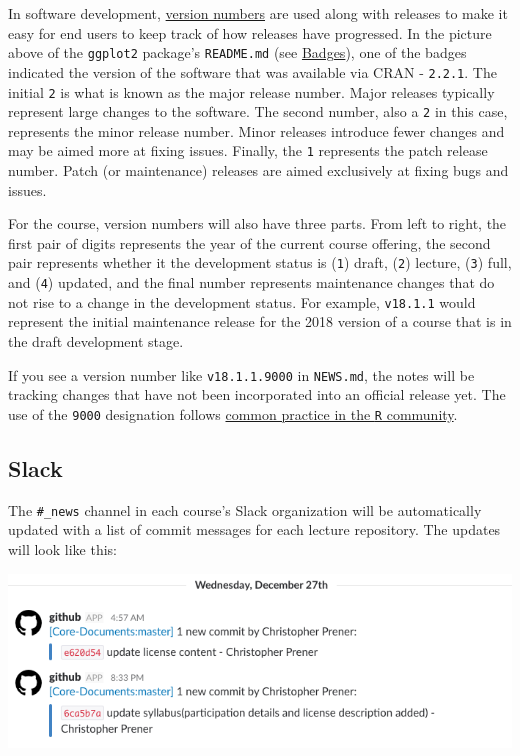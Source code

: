 \documentclass[]{book}
\theoremstyle{definition}
\theoremstyle{definition}
\theoremstyle{definition}
\theoremstyle{remark}
\begin{document}
In software development,
\href{https://en.wikipedia.org/wiki/Software_versioning}{version
numbers} are used along with releases to make it easy for end users to
keep track of how releases have progressed. In the picture above of the
\texttt{ggplot2} package's \texttt{README.md} (see
\protect\hyperlink{badges}{Badges}), one of the badges indicated the
version of the software that was available via CRAN - \texttt{2.2.1}.
The initial \texttt{2} is what is known as the major release number.
Major releases typically represent large changes to the software. The
second number, also a \texttt{2} in this case, represents the minor
release number. Minor releases introduce fewer changes and may be aimed
more at fixing issues. Finally, the \texttt{1} represents the patch
release number. Patch (or maintenance) releases are aimed exclusively at
fixing bugs and issues.

For the course, version numbers will also have three parts. From left to
right, the first pair of digits represents the year of the current
course offering, the second pair represents whether it the development
status is (\texttt{1}) draft, (\texttt{2}) lecture, (\texttt{3}) full,
and (\texttt{4}) updated, and the final number represents maintenance
changes that do not rise to a change in the development status. For
example, \texttt{v18.1.1} would represent the initial maintenance
release for the 2018 version of a course that is in the draft
development stage.

If you see a version number like \texttt{v18.1.1.9000} in
\texttt{NEWS.md}, the notes will be tracking changes that have not been
incorporated into an official release yet. The use of the \texttt{9000}
designation follows \href{http://r-pkgs.had.co.nz/release.html}{common
practice in the \texttt{R} community}.

\subsection{Slack}\label{slack}

The \texttt{\#\_news} channel in each course's Slack organization will
be automatically updated with a list of commit messages for each lecture
repository. The updates will look like this:

\begin{center}\includegraphics[width=0.95\linewidth]{images/slackNews} \end{center}
\end{document}
